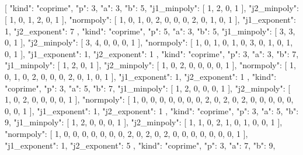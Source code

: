 \documentclass[11pt,a4paper]{article}
\begin{document}
\subsection*{\texorpdfstring{}{psl2 square witnesses.json}}
\begin{CompleteProgram}
[
  {
    "kind": "coprime",
    "p": 3,
    "a": 3,
    "b": 5,
    "j1_minpoly": [
      1,
      2,
      0,
      1
    ],
    "j2_minpoly": [
      1,
      0,
      1,
      2,
      0,
      1
    ],
    "normpoly": [
      1,
      0,
      1,
      0,
      2,
      0,
      0,
      0,
      2,
      0,
      1,
      0,
      1
    ],
    "j1_exponent": 1,
    "j2_exponent": 7
  },
  {
    "kind": "coprime",
    "p": 5,
    "a": 3,
    "b": 5,
    "j1_minpoly": [
      3,
      3,
      0,
      1
    ],
    "j2_minpoly": [
      3,
      4,
      0,
      0,
      0,
      1
    ],
    "normpoly": [
      1,
      0,
      1,
      0,
      1,
      0,
      3,
      0,
      1,
      0,
      1,
      0,
      1
    ],
    "j1_exponent": 1,
    "j2_exponent": 1
  },
  {
    "kind": "coprime",
    "p": 3,
    "a": 3,
    "b": 7,
    "j1_minpoly": [
      1,
      2,
      0,
      1
    ],
    "j2_minpoly": [
      1,
      0,
      2,
      0,
      0,
      0,
      0,
      1
    ],
    "normpoly": [
      1,
      0,
      1,
      0,
      2,
      0,
      0,
      0,
      2,
      0,
      1,
      0,
      1
    ],
    "j1_exponent": 1,
    "j2_exponent": 1
  },
  {
    "kind": "coprime",
    "p": 3,
    "a": 5,
    "b": 7,
    "j1_minpoly": [
      1,
      2,
      0,
      0,
      0,
      1
    ],
    "j2_minpoly": [
      1,
      0,
      2,
      0,
      0,
      0,
      0,
      1
    ],
    "normpoly": [
      1,
      0,
      0,
      0,
      0,
      0,
      0,
      0,
      2,
      0,
      2,
      0,
      2,
      0,
      0,
      0,
      0,
      0,
      0,
      0,
      1
    ],
    "j1_exponent": 1,
    "j2_exponent": 1
  },
  {
    "kind": "coprime",
    "p": 3,
    "a": 5,
    "b": 9,
    "j1_minpoly": [
      1,
      2,
      0,
      0,
      0,
      1
    ],
    "j2_minpoly": [
      1,
      1,
      0,
      2,
      1,
      0,
      1,
      0,
      0,
      1
    ],
    "normpoly": [
      1,
      0,
      0,
      0,
      0,
      0,
      0,
      0,
      2,
      0,
      2,
      0,
      2,
      0,
      0,
      0,
      0,
      0,
      0,
      0,
      1
    ],
    "j1_exponent": 1,
    "j2_exponent": 5
  },
  {
    "kind": "coprime",
    "p": 3,
    "a": 7,
    "b": 9,
}
\end{CompleteProgram}
\end{document}
